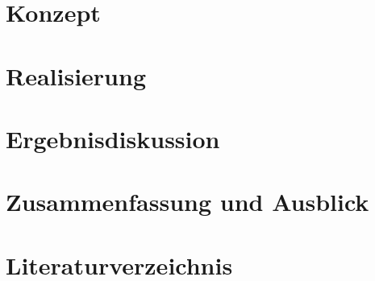 \documentclass[a4paper, 12pt]{scrartcl}
\begin{document}
    \section{Konzept}
    
    
    \section{Realisierung}
    
    
    \section{Ergebnisdiskussion}
    
    
    \section{Zusammenfassung und Ausblick}
    
 
	\section{Literaturverzeichnis}
	\nocite{*}
    \renewcommand{\refname}{}
	\printbibliography
 
	\newpage
	
\end{document}
